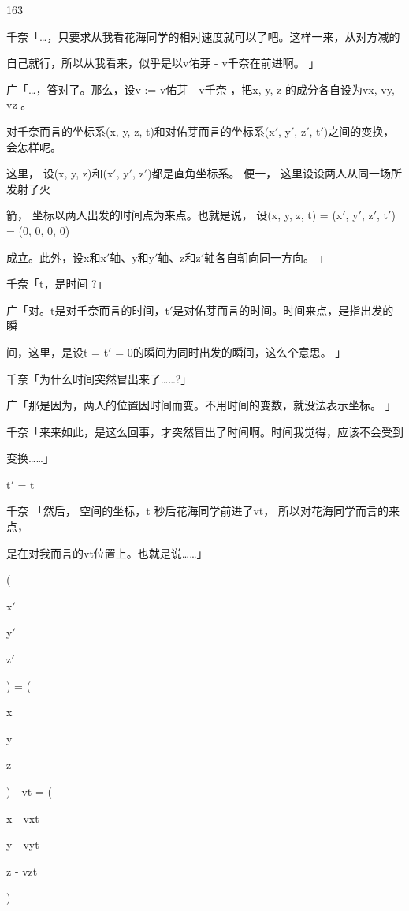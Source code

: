 163\par
千奈「…，只要求从我看花海同学的相对速度就可以了吧。这样一来，从对方减的\par
自己就行，所以从我看来，似乎是以v佑芽 - v千奈在前进啊。 」\par
广「…，答对了。那么，设v := v佑芽 - v千奈 ，把x, y, z 的成分各自设为vx, vy, vz 。\par
对千奈而言的坐标系(x, y, z, t)和对佑芽而言的坐标系(x$\prime$, y$\prime$, z$\prime$, t$\prime$)之间的变换， 会怎样呢。\par
这里， 设(x, y, z)和(x$\prime$, y$\prime$, z$\prime$)都是直角坐标系。 便一， 这里设设两人从同一场所发射了火\par
箭， 坐标以两人出发的时间点为来点。也就是说， 设(x, y, z, t) = (x$\prime$, y$\prime$, z$\prime$, t$\prime$) = (0, 0, 0, 0)\par
成立。此外，设x和x$\prime$轴、y和y$\prime$轴、z和z$\prime$轴各自朝向同一方向。 」\par
千奈「t，是时间 ?」\par
广「对。t是对千奈而言的时间，t$\prime$是对佑芽而言的时间。时间来点，是指出发的瞬\par
间，这里，是设t = t$\prime$ = 0的瞬间为同时出发的瞬间，这么个意思。 」\par
千奈「为什么时间突然冒出来了……?」\par
广「那是因为，两人的位置因时间而变。不用时间的变数，就没法表示坐标。 」\par
千奈「来来如此，是这么回事，才突然冒出了时间啊。时间我觉得，应该不会受到\par
变换……」\par
t$\prime$ = t\par
千奈 「然后， 空间的坐标，t 秒后花海同学前进了vt， 所以对花海同学而言的来点，\par
是在对我而言的vt位置上。也就是说……」\par
(\par
x$\prime$\par
y$\prime$\par
z$\prime$\par
) = (\par
x\par
y\par
z\par
) - vt = (\par
x - vxt\par
y - vyt\par
z - vzt\par
)\par
